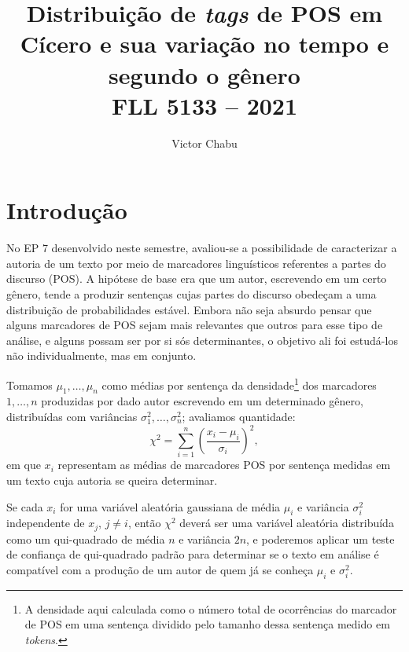 \documentclass[10pt,a4paper,onecolumn]{article}
\theoremstyle{definition}
\theoremstyle{remark}
\begin{document}
\title{\huge \textbf{Distribuição de \emph{tags} de POS em Cícero e sua variação no tempo e segundo o gênero} \\ \Large FLL 5133 -- 2021}
\author{\large Victor Chabu} 
\date{}
\maketitle

\section{Introdução}
No EP 7 desenvolvido neste semestre, avaliou-se a possibilidade de caracterizar a autoria de um texto por meio de marcadores linguísticos referentes a partes do discurso (POS). A hipótese de base era que um autor, escrevendo em um certo gênero, tende a produzir sentenças cujas partes do discurso obedeçam a uma distribuição de probabilidades estável. Embora não seja absurdo pensar que alguns marcadores de POS sejam mais relevantes que outros para esse tipo de análise, e alguns possam ser por si sós determinantes, o objetivo ali foi estudá-los não individualmente, mas em conjunto. 

Tomamos $\mu_1,\dots,\mu_n$ como médias por sentença da densidade\footnote{A densidade aqui calculada como o número total de ocorrências do marcador de POS em uma sentença dividido pelo tamanho dessa sentença medido em \emph{tokens}.} dos marcadores $1,\dots,n$ produzidas por dado autor escrevendo em um determinado gênero, distribuídas com variâncias $\sigma_1^2,\dots,\sigma_n^2$; avaliamos quantidade:
\begin{equation}\label{eq:chi}
	\chi^2 = \sum_{i = 1}^{n} \left( \frac{x_i-\mu_i}{\sigma_i} \right)^2,
\end{equation}
em que $x_i$ representam as médias de marcadores POS por sentença medidas em um texto cuja autoria se queira determinar.

Se cada $x_i$ for uma variável aleatória gaussiana de média $\mu_i$ e variância $\sigma_i^2$ independente de $x_j$, $j \neq i$, então $\chi^2$ deverá ser uma variável aleatória distribuída como um qui-quadrado de média $n$ e variância $2n$, e poderemos aplicar um teste de confiança de qui-quadrado padrão para determinar se o texto em análise é compatível com a produção de um autor de quem já se conheça $\mu_i$ e $\sigma_i^2$.
\end{document}
